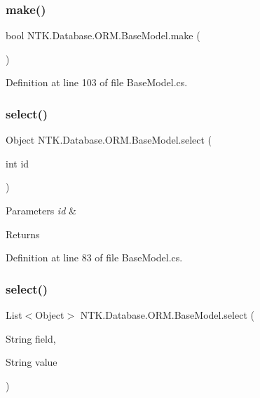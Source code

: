\subsubsection{\texorpdfstring{make()}{make()}}
{\footnotesize\ttfamily bool N\+T\+K.\+Database.\+O\+R\+M.\+Base\+Model.\+make (\begin{DoxyParamCaption}{ }\end{DoxyParamCaption})}



Definition at line 103 of file Base\+Model.\+cs.

\mbox{\label{class_n_t_k_1_1_database_1_1_o_r_m_1_1_base_model_ad9992bd978af3383673ed717d33fc927}} 
\subsubsection{\texorpdfstring{select()}{select()}\hspace{0.1cm}{\footnotesize\ttfamily [1/2]}}
{\footnotesize\ttfamily Object N\+T\+K.\+Database.\+O\+R\+M.\+Base\+Model.\+select (\begin{DoxyParamCaption}\item[{int}]{id }\end{DoxyParamCaption})}






\begin{DoxyParams}{Parameters}
{\em id} & \\
\hline
\end{DoxyParams}
\begin{DoxyReturn}{Returns}

\end{DoxyReturn}


Definition at line 83 of file Base\+Model.\+cs.

\mbox{\label{class_n_t_k_1_1_database_1_1_o_r_m_1_1_base_model_ad846e735f4153d31b4e9127343edf3c3}} 
\subsubsection{\texorpdfstring{select()}{select()}\hspace{0.1cm}{\footnotesize\ttfamily [2/2]}}
{\footnotesize\ttfamily List$<$Object$>$ N\+T\+K.\+Database.\+O\+R\+M.\+Base\+Model.\+select (\begin{DoxyParamCaption}\item[{String}]{field,  }\item[{String}]{value }\end{DoxyParamCaption})}






